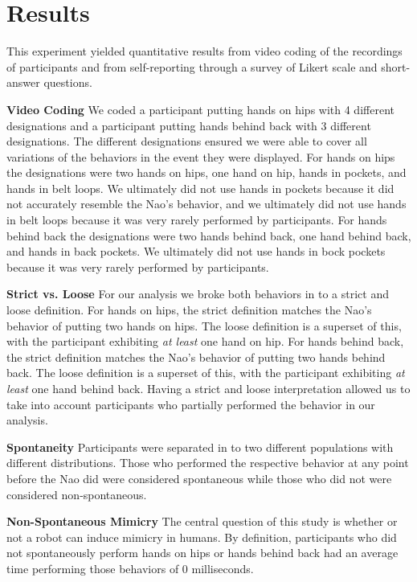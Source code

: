 \documentclass{acm_proc_article-sp}
\begin{document}
\section{Results}
This experiment yielded quantitative results from video coding of the recordings of participants and from self-reporting through a survey of Likert scale and short-answer questions. 

\textbf{Video Coding} We coded a participant putting hands on hips with 4 different designations and a participant putting hands behind back with 3 different designations. The different designations ensured we were able to cover all variations of the behaviors in the event they were displayed. For hands on hips the designations were two hands on hips, one hand on hip, hands in pockets, and hands in belt loops. We ultimately did not use hands in pockets because it did not accurately resemble the Nao's behavior, and we ultimately did not use hands in belt loops because it was very rarely performed by participants. For hands behind back the designations were two hands behind back, one hand behind back, and hands in back pockets. We ultimately did not use hands in bock pockets because it was very rarely performed by participants.
	
\textbf{Strict vs. Loose} For our analysis we broke both behaviors in to a strict and loose definition. For hands on hips, the strict definition matches the Nao's behavior of putting two hands on hips. The loose definition is a superset of this, with the participant exhibiting \textit{at least} one hand on hip. For hands behind back, the strict definition matches the Nao's behavior of putting two hands behind back. The loose definition is a superset of this, with the participant exhibiting \textit{at least} one hand behind back. Having a strict and loose interpretation allowed us to take into account participants who partially performed the behavior in our analysis. 

\textbf{Spontaneity} Participants were separated in to two different populations with different distributions. Those who performed the respective behavior at any point before the Nao did were considered spontaneous while those who did not were considered non-spontaneous.

\textbf{Non-Spontaneous Mimicry} The central question of this study is whether or not a robot can induce mimicry in humans. By definition, participants who did not spontaneously perform hands on hips or hands behind back had an average time performing those behaviors of 0 milliseconds. 
\end{document}
